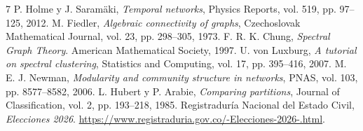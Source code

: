 \documentclass[journal]{IEEEtran}
\begin{document}
\begin{thebibliography}{7}
 P. Holme y J. Saramäki, \emph{Temporal networks}, Physics Reports, vol. 519, pp. 97--125, 2012.
 M. Fiedler, \emph{Algebraic connectivity of graphs}, Czechoslovak Mathematical Journal, vol. 23, pp. 298--305, 1973.
 F. R. K. Chung, \emph{Spectral Graph Theory}. American Mathematical Society, 1997.
 U. von Luxburg, \emph{A tutorial on spectral clustering}, Statistics and Computing, vol. 17, pp. 395--416, 2007.
 M. E. J. Newman, \emph{Modularity and community structure in networks}, PNAS, vol. 103, pp. 8577--8582, 2006.
 L. Hubert y P. Arabie, \emph{Comparing partitions}, Journal of Classification, vol. 2, pp. 193--218, 1985.
 Registraduría Nacional del Estado Civil, \emph{Elecciones 2026}. \url{https://www.registraduria.gov.co/-Elecciones-2026-.html}.
\end{thebibliography}
\end{document}
